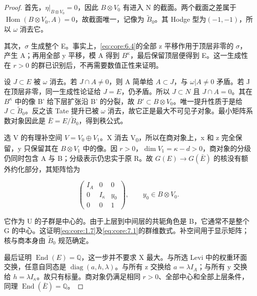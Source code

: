 \documentclass[11pt,a4paper,oneside]{ctexart}
\theoremstyle{cnplain}
\theoremstyle{definition}
\theoremstyle{remark}
\numberwithin{equation}{section}
\begin{document}
\begin{proof}

首先，\(\eta|_{B\otimes V_0}=0\)，因此 \(B\otimes V_{0}\) 有进入 N 的截面。两个截面之差属于 \(\operatorname{Hom}(B\otimes V_0,A)=0\)，故截面唯一，记像为 \(\widetilde B_0\)。其 Hodge 型为\((- 1,- 1)\)，所以 \(\omega \) 消去它。

其次，\(\sigma \) 生成整个 E。事实上，\eqref{eq:core:6.4}的全部 z 平移作用于顶层非零的 \(\sigma \)，产生 A；再用全部 y 平移，模 A 得到 \(B^\kappa \)，最后保留顶层便得到 E。这一生成性在 \(r>0\) 的群已识别后，不再需要数值正性来证明。

设 \(J\subset E\) 被 \(\omega \) 消去。若 \(J\cap A\ne 0\)，则 A 简单给 \(A\subset J\)，与 \(\omega|A\ne0\) 矛盾。若 J 在顶层非零，同一生成性论证给 \(J=E\)，仍矛盾。所以 \(J\subset N\) 且 \(J\cap A=0\)。其在 \(B^\kappa \) 中的像 B' 给下层扩张沿 B' 的分裂，故 \(B'\subset B\otimes V_{0}\)。唯一提升性质于是给 \(J\subset\widetilde B_0\)。反之该 Tate 提升已被 \(\omega \) 消去，故它正是最大不可见子对象。最小矩阵系数对象因此是 \(\bar E=E/\widetilde B_0\)，得到秩公式。

选 V 的有理补空间 \(V=V_0\oplus V_1\)。X 消去 V\textsubscript{0}，所以在商对象上，x 和 z 完全保留，y 只保留其在 \(B\otimes V_{1}\) 中的像。因 \(r>0\)，\(\dim V_1=\kappa-d>0\)，商对象的分级仍同时包含 A 与 B；分级表示仍忠实于原 R。故 \(G(E)\to G(\bar E)\) 的核没有额外约化部分，其矩阵恰为

\begin{equation}
\begin{pmatrix}I_A&0&0\\0&I_\kappa&y_0\\0&0&1\end{pmatrix},
                 \qquad y_0\in B\otimes V_0.             \label{eq:core:7.2}
\end{equation}

它作为 U 的子群是中心的。由于上层到中间层的共轭角色是 B，它通常不是整个 G 的中心。这证明\eqref{eq:core:1.7}及\eqref{eq:core:7.1}的群维数式。补空间用于显示矩阵；核与商本身由 \(\widetilde B_0\) 规范确定。

最后证明 \(\operatorname{End}(E)=\mathbb Q\)，这一步并不要求 X 最大。与所选 Levi 中的权重环面交换，任意自同态是 \(\operatorname{diag}(a,h,\lambda )\)。与所有 z 交换给 \(a=\lambda I_A\)；与所有 y 交换给 \(h=\lambda I_\kappa \)。故只有标量。商对象仍满足相同 \(r>0\)、全部中心和全部上层条件，同理 \(\operatorname{End}(\bar E)=\mathbb Q\)。

\end{proof}
\end{document}
